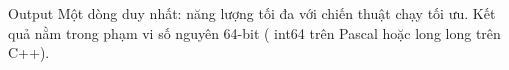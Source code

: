 Output
Một dòng duy nhất: năng lượng tối đa với chiến thuật chạy tối ưu. Kết quả nằm trong phạm vi số nguyên 64-bit (   int64   trên Pascal hoặc   long long   trên C++).